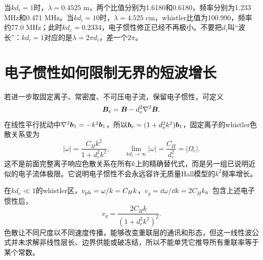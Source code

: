 当$kd_i=1$时，$\lambda=0.4525$ m，两个比值分别为1.6180和0.6180，频率分别为1.233 MHz和0.471 MHz。当$kd_i=10$时，$\lambda=4.525$ cm，whistler比值为100.990，频率约77.0 MHz；此时$kd_e=0.2334$，电子惯性修正已经不再极小。不要把$d_i$叫“波长”：$k d_i=1$对应的是$\lambda=2\pi d_i$，差一个$2\pi$。

\section{电子惯性如何限制无界的短波增长}
若进一步取固定离子、常密度、不可压电子流，保留电子惯性，可定义
\begin{equation}\bm{B}_e=\bm{B}-d_e^2\nabla^2\bm{B}.\end{equation}
在线性平行扰动中$\nabla^2\bm{b}_1=-k^2\bm{b}_1$，所以$\bm{b}_e=(1+d_e^2k^2)\bm{b}_1$，固定离子的whistler色散关系变为
\begin{equation}
|\omega|=\frac{C_Hk^2}{1+d_e^2k^2},\qquad
\lim_{kd_e\to\infty}|\omega|=\frac{C_H}{d_e^2}=|\Omega_e|.
\end{equation}
这不是前面完整离子响应色散关系在所有$k$上的精确替代式，而是另一组已说明近似的电子流体极限。它说明电子惯性不会永远容许无质量Hall模型的$k^2$频率增长。

在$kd_e\ll1$的whistler区，$v_{\rm ph}=\omega/k=C_Hk$，$v_g=\dd\omega/\dd k=2C_Hk$。包含上述电子惯性后，
\begin{equation}v_g=\frac{2C_Hk}{(1+d_e^2k^2)^2}.\end{equation}
色散让不同尺度以不同速度传播，能够改变重联层的通讯和形态，但这一线性波公式并未求解非线性层长、边界供能或破冻结，所以不能单凭它推导所有重联率等于某个常数。
